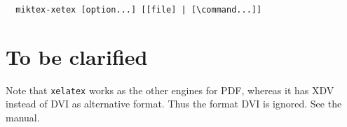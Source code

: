 \documentclass[a4paper]{article}%
\newcommand{\lualatex}{\texttt{lualatex}}
\newcommand{\xelatex}{\texttt{xelatex}}
\newcommand{\texlive}{\TeX~Live}
\newcommand{\miktex}{MiKTeX}
\begin{document}


  
  
  

\begin{verbatim}
  miktex-xetex [option...] [[file] | [\command...]]
\end{verbatim}






\section{To be clarified}\label{sec:TBC}

Note that \xelatex{} works as the other engines for PDF, 
whereas it has XDV instead of DVI as alternative format. 
Thus the format DVI is ignored. 
See the manual. 



{}%
\end{document}
